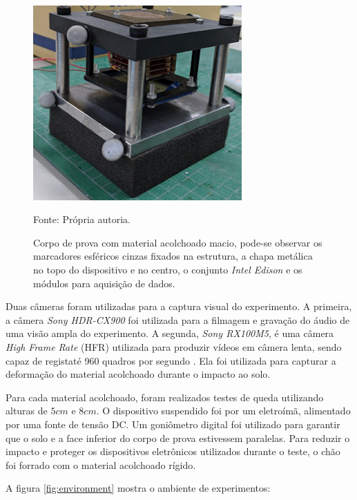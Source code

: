  \begin{figure}[H]  
        \centering
        \caption{Corpo de prova com material acolchoado macio, pode-se observar os marcadores esféricos cinzas fixados na estrutura, a chapa metálica no topo do dispositivo e no centro, o conjunto \textit{Intel Edison} e os módulos para aquisição de dados.}
        \includegraphics[width=8cm]{./figs/soft_drop_test.PNG}
        \par\medskip
        Fonte: Própria autoria.
        \label{fig:SoftCorpo}
\end{figure}

Duas câmeras foram utilizadas para a captura visual do experimento. A primeira, a câmera \textit{Sony HDR-CX900} foi utilizada para a filmagem e gravação do áudio de uma visão ampla do experimento. A segunda, \textit{Sony RX100M5}, é uma câmera \textit{High Frame Rate} (HFR) utilizada para produzir vídeos em câmera lenta, sendo capaz de registaté 960 quadros por segundo \cite{sonyHFR}. Ela foi utilizada para capturar a deformação do material acolchoado durante o impacto ao solo.

Para cada material acolchoado, foram realizados testes de queda utilizando alturas de $5cm$ e $8cm$. O dispositivo suspendido foi por um eletroímã, alimentado por uma fonte de tensão DC. Um goniômetro digital foi utilizado para garantir que o solo e a face inferior do corpo de prova estivessem paralelas. Para reduzir o impacto e proteger os dispositivos eletrônicos utilizados durante o teste, o chão foi forrado com o material acolchoado rígido.

A figura \ref{fig:environment} mostra o ambiente de experimentos:

